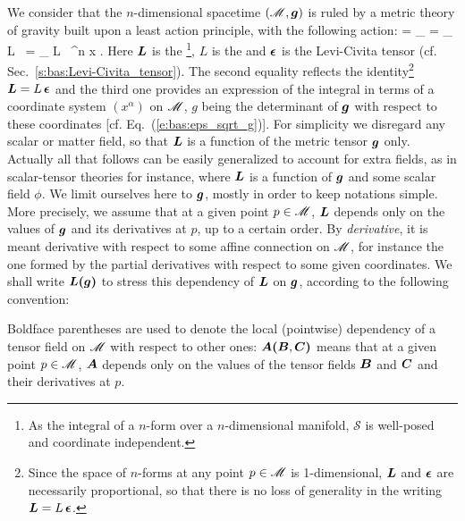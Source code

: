We consider that the $n$-dimensional spacetime $(\mathscr{M},\bm{g})$ is ruled by a metric theory of gravity built upon
a least action principle, with the following action:
\be \label{e:tha:action_L}
     = \int_{\M}  = \int_{\M} L \, \weps = \int_{\M} L  \, \D^n x .
\ee
Here $\bm{L}$ is the \footnote{As the integral of a $n$-form over a $n$-dimensional manifold, $\mathcal{S}$ is well-posed and coordinate independent.},
$L$ is the 
and
$\bm{\epsilon}$ is the Levi-Civita tensor (cf. Sec.~\ref{s:bas:Levi-Civita_tensor}).
The second equality reflects the identity\footnote{Since the space of $n$-forms at any
point $p\in\mathscr{M}$ is 1-dimensional, $\bm{L}$ and $\bm{\epsilon}$ are
necessarily proportional, so that there is no loss of generality in the writing
$\bm{L} = L \, \bm{\epsilon}$.} $\bm{L} = L \, \bm{\epsilon}$ and the third one provides an expression of the integral
in terms of a coordinate system $(x^\alpha)$ on $\mathscr{M}$, $g$ being the determinant of
$\bm{g}$ with respect to these coordinates [cf. Eq.~(\ref{e:bas:eps_sqrt_g})].
For simplicity we disregard any scalar or matter field, so that
$\bm{L}$ is a function of the metric tensor $\bm{g}$ only.
Actually all that follows can be easily generalized to account for
extra fields, as in scalar-tensor theories for instance, where $\bm{L}$ is a function
of $\bm{g}$ and some scalar field $\phi$. We limit ourselves here to $\bm{g}$,
mostly in order to keep notations simple.
More precisely, we assume that at a given point $p\in\mathscr{M}$, $\bm{L}$ depends only
on the values of $\bm{g}$ and its derivatives at $p$, up to a certain order.
By \emph{derivative}, it is
meant derivative with respect to some affine connection on $\mathscr{M}$, for instance the one
formed by the partial derivatives with respect to some given coordinates. We shall
write $\bm{L}\textbf{(}\bm{g}\textbf{)}$ to stress this dependency of $\bm{L}$ on $\bm{g}$, according
to the following convention:
\begin{notation}
\label{n:tha:bold_parentheses}
Boldface parentheses are used to denote the local (pointwise) dependency of a
tensor field on $\mathscr{M}$ with respect to other ones: $\bm{A}\textbf{(} \bm{B}, \bm{C} \textbf{)}$
means that at a given point $p\in\mathscr{M}$, $\bm{A}$ depends only
on the values of the tensor fields $\bm{B}$ and $\bm{C}$ and their derivatives at $p$.
\end{notation}

